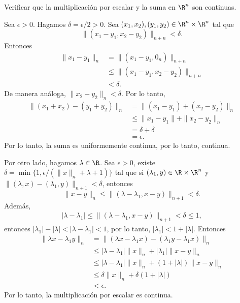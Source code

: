 \begin{ejercicio}
        Verificar que la multiplicación por escalar y la suma en $\R^n$ son continuas.
    \end{ejercicio}

\begin{demostracion}
Sea $\epsilon>0$. Hagamos $\delta=\epsilon/2>0$. Sea $(x_1,x_2),(y_1,y_2)\in\R^n\times \R^n$ tal que 
$$\|(x_1-y_1,x_2-y_2)\|_{n+n}<\delta.$$ 
Entonces
\begin{align*}
    \|x_1-y_1\|_{n}&=\|(x_1-y_1,0_n)\|_{n+n}\\
    &\leq \|(x_1-y_1,x_2-y_2)\|_{n+n}\\
    &< \delta.
\end{align*}
De manera análoga, $\|x_2-y_2\|_{n}<\delta$. Por lo tanto,
\begin{align*}
    \|(x_1+x_2)-(y_1+y_2)\|_{n}&= \|(x_1-y_1)+(x_2-y_2)\|_{n}\\
    &\leq \|x_1-y_1\|+\|x_2-y_2\|_{n}\\
    &=\delta+\delta\\
    &=\epsilon.
\end{align*}
Por lo tanto, la suma es uniformemente continua, por lo tanto, continua.

Por otro lado, hagamos $\lambda\in\R$. Sea $\epsilon>0$, existe $\delta=\min\{1,\epsilon/(\|x\|_n+\lambda+1)\}$ tal que si $(\lambda_1,y)\in \R\times\R^n$ y
$\|(\lambda,x)-(\lambda_1,y)\|_{n+1}<\delta$, entonces 
$$\|x-y\|_n\leq \|(\lambda-\lambda_1,x-y)\|_{n+1}<\delta.$$
Además,
\begin{align*}
    |\lambda-\lambda_1|\leq \|(\lambda-\lambda_1,x-y)\|_{n+1}<\delta\leq 1,
\end{align*}
entonces
$|\lambda_1|-|\lambda|<|\lambda-\lambda_1|<1$, por lo tanto, $|\lambda_1|<1+|\lambda|.$ Entonces
\begin{align*}
    \|\lambda x-\lambda_1 y\|_n&=\|(\lambda x-\lambda_1 x)-(\lambda_1 y-\lambda_1 x)\|_n\\
    &\leq |\lambda-\lambda_1|\|x\|_n+|\lambda_1|\|x-y\|_n\\
    &\leq |\lambda-\lambda_1|\|x\|_n+(1+|\lambda|)\|x-y\|_n\\
    &\leq \delta\|x\|_n+\delta(1+|\lambda|)\\
    &<\epsilon.
\end{align*}
Por lo tanto, la multiplicación por escalar es continua.
\end{demostracion}

